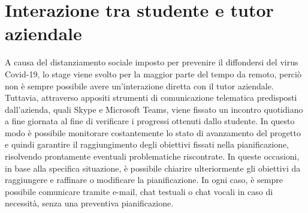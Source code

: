 
\section{Interazione tra studente e tutor aziendale}
	A causa del distanziamento sociale imposto per prevenire il diffondersi del virus Covid-19, lo stage viene svolto per la maggior parte del tempo da remoto, perciò non è sempre possibile avere un'interazione diretta con il tutor aziendale.
	\newline
	Tuttavia, attraverso appositi strumenti di comunicazione telematica predisposti dall'azienda, quali Skype e Microsoft Teams, viene fissato un incontro quotidiano a fine giornata al fine di verificare i progressi ottenuti dallo studente. In questo modo è possibile monitorare costantemente lo stato di avanzamento del progetto e quindi garantire il raggiungimento degli obiettivi fissati nella pianificazione, risolvendo prontamente eventuali problematiche riscontrate. 
	\newline
	In queste occasioni, in base alla specifica situazione, è possibile chiarire ulteriormente gli obiettivi da raggiungere e raffinare o modificare la pianificazione.
	\newline
	In ogni caso, è sempre possibile comunicare tramite e-mail, chat testuali o chat vocali in caso di necessità, senza una preventiva pianificazione.
	
